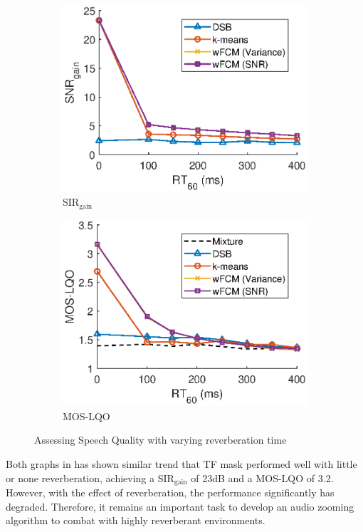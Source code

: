\documentclass[a4paper,twoside,12pt,hidelinks]{article}
\begin{document}
\begin{figure}[H]
\centering	
\begin{subfigure}[H]{0.49\textwidth}
\includegraphics[width=\textwidth]{evalsir}
\caption{SIR$_\text{gain}$}
\end{subfigure}
\begin{subfigure}[H]{0.49\textwidth}
\includegraphics[width=\textwidth]{evalpesq}
\caption{MOS-LQO}
\end{subfigure}
\caption{Assessing Speech Quality with varying reverberation time}
\label{fig:speechquality}
\end{figure}
Both graphs in  has shown similar trend that TF mask performed well with little or none reverberation, achieving a SIR$_\text{gain}$ of 23dB and a MOS-LQO of 3.2. However, with the effect of reverberation, the performance significantly has degraded. Therefore, it remains an important task to develop an audio zooming algorithm to combat with highly reverberant environments.
\end{document}
